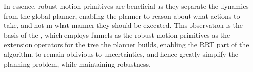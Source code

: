 In essence, robust motion primitives are beneficial as they separate the
dynamics from the global planner, enabling the planner to reason about what
actions to take, and not in what manner they should be executed. This
observation is the basis of the \rrtfunnel{}, which employs funnels as the
robust motion primitives as the extension operators for the tree the planner
builds, enabling the \ac{RRT} part of the \rrtfunnel{} algorithm to remain
oblivious to uncertainties, and hence greatly simplify the planning problem,
while maintaining robustness.


